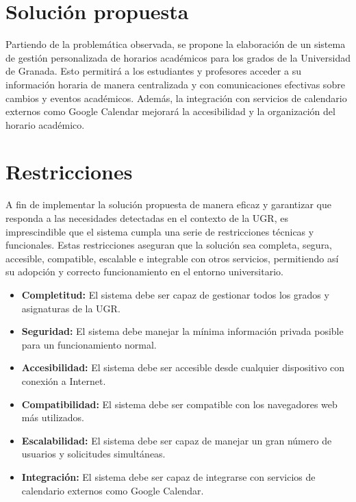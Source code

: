 

\section{Solución propuesta}

Partiendo de la problemática observada, se propone la elaboración de un sistema de gestión personalizada de horarios académicos para los grados de la Universidad de Granada. 
Esto permitirá a los estudiantes y profesores acceder a su información horaria de manera centralizada y con comunicaciones efectivas sobre cambios y eventos académicos. Además, la integración con servicios de calendario externos como Google Calendar mejorará la accesibilidad y la organización del horario académico.

\section{Restricciones}

A fin de implementar la solución propuesta de manera eficaz y garantizar que responda a las necesidades detectadas en el contexto de la UGR, es imprescindible que el sistema cumpla una serie de restricciones técnicas y funcionales. Estas restricciones aseguran que la solución sea completa, segura, accesible, compatible, escalable e integrable con otros servicios, permitiendo así su adopción y correcto funcionamiento en el entorno universitario.

\begin{itemize}
    \item \textbf{Completitud:} El sistema debe ser capaz de gestionar todos los grados y asignaturas de la UGR.
    \item \textbf{Seguridad:} El sistema debe manejar la mínima información privada posible para un funcionamiento normal.
    \item \textbf{Accesibilidad:} El sistema debe ser accesible desde cualquier dispositivo con conexión a Internet.
    \item \textbf{Compatibilidad:} El sistema debe ser compatible con los navegadores web más utilizados.
    \item \textbf{Escalabilidad:} El sistema debe ser capaz de manejar un gran número de usuarios y solicitudes simultáneas.
    \item \textbf{Integración:} El sistema debe ser capaz de integrarse con servicios de calendario externos como Google Calendar.
\end{itemize}

